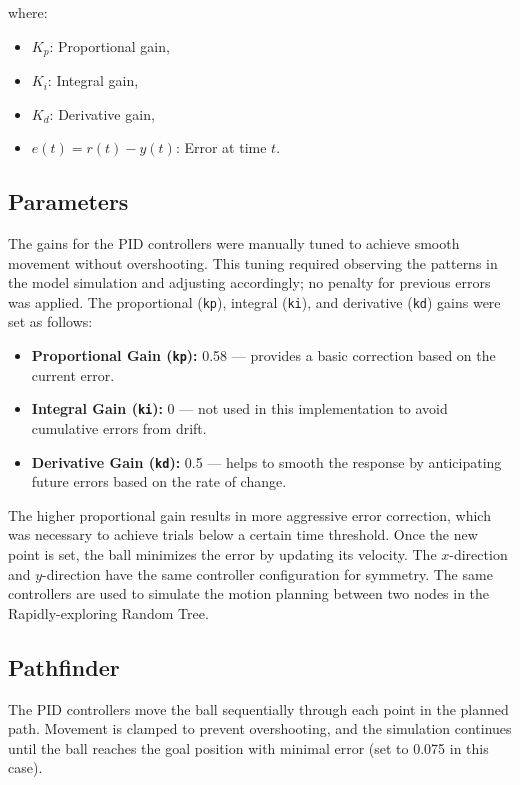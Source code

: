 \documentclass[12pt]{article}
\begin{document}
where:
\begin{itemize}
    \item \( K_p \): Proportional gain,
    \item \( K_i \): Integral gain,
    \item \( K_d \): Derivative gain,
    \item \( e(t) = r(t) - y(t) \): Error at time \( t \).
\end{itemize}

\subsection{Parameters}
The gains for the PID controllers were manually tuned to achieve smooth movement without overshooting. This tuning required observing the patterns in the model simulation and adjusting accordingly; no penalty for previous errors was applied. The proportional (\texttt{kp}), integral (\texttt{ki}), and derivative (\texttt{kd}) gains were set as follows:
\begin{itemize}
    \item \textbf{Proportional Gain (\texttt{kp}):} 0.58 — provides a basic correction based on the current error.
    \item \textbf{Integral Gain (\texttt{ki}):} 0 — not used in this implementation to avoid cumulative errors from drift.
    \item \textbf{Derivative Gain (\texttt{kd}):} 0.5 — helps to smooth the response by anticipating future errors based on the rate of change.
\end{itemize}

The higher proportional gain results in more aggressive error correction, which was necessary to achieve trials below a certain time threshold. Once the new point is set, the ball minimizes the error by updating its velocity. The \(x\)-direction and \(y\)-direction have the same controller configuration for symmetry. The same controllers are used to simulate the motion planning between two nodes in the Rapidly-exploring Random Tree.

\subsection{Pathfinder}
The PID controllers move the ball sequentially through each point in the planned path. Movement is clamped to prevent overshooting, and the simulation continues until the ball reaches the goal position with minimal error (set to 0.075 in this case). 
\end{document}
